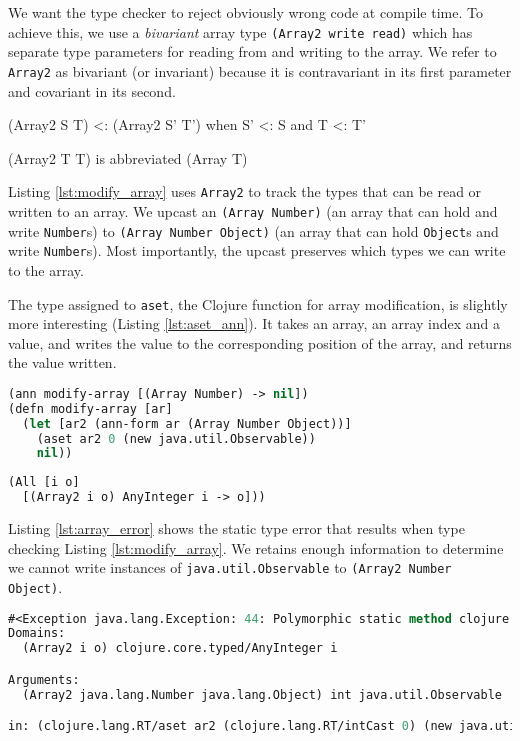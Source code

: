 \documentclass[preprint]{sigplanconf}
\begin{document}
We want the type checker to reject obviously wrong code at compile time.
To achieve this, we use a \emph{bivariant} array type
\lstinline|(Array2 write read)| which has separate type parameters for
reading from and writing to the array. We refer to \lstinline|Array2| as bivariant (or invariant)
because it is contravariant in its first parameter and covariant in its second.

\begin{verb}
(Array2 S T) <: (Array2 S' T') 
  when S' <: S and T <: T'

(Array2 T T) is abbreviated (Array T)
\end{verb}

Listing \ref{lst:modify_array} uses \lstinline|Array2|
to track the types that can be read or written to an array.
We upcast an \lstinline|(Array Number)| (an array that can hold and write \lstinline|Number|s)
to \lstinline|(Array Number Object)| (an array that can hold \lstinline|Object|s and write
\lstinline|Number|s).
Most importantly, the upcast preserves which types we can write to the array.

The type assigned to \lstinline|aset|, the Clojure function for array modification, is slightly more interesting
(Listing \ref{lst:aset_ann}).
It takes an array, an array index and a value, and writes the value to the corresponding position of the array,
and returns the value written.

\begin{lstlisting}[language=lisp, label=lst:modify_array, caption=A type error with bivariant array types in core.typed]
(ann modify-array [(Array Number) -> nil])
(defn modify-array [ar]
  (let [ar2 (ann-form ar (Array Number Object))]
    (aset ar2 0 (new java.util.Observable))
    nil))
\end{lstlisting}

\begin{lstlisting}[language=Lisp, label=lst:aset_ann, caption=Type for aset]
(All [i o]
  [(Array2 i o) AnyInteger i -> o]))
\end{lstlisting}

Listing \ref{lst:array_error} shows the static type error that results when type checking Listing \ref{lst:modify_array}.
We retains enough information to determine we cannot write instances of
\lstinline|java.util.Observable| to \lstinline|(Array2 Number Object)|.

\begin{lstlisting}[language=lisp, label=lst:array_error, caption=Static type error for ill-typed array set]
#<Exception java.lang.Exception: 44: Polymorphic static method clojure.lang.RT/aset could not be applied to arguments:
Domains: 
  (Array2 i o) clojure.core.typed/AnyInteger i

Arguments:
  (Array2 java.lang.Number java.lang.Object) int java.util.Observable

in: (clojure.lang.RT/aset ar2 (clojure.lang.RT/intCast 0) (new java.util.Observable))>
\end{lstlisting}
\end{document}
